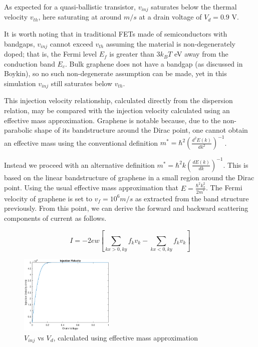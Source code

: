\documentclass[11pt]{article}
\begin{document}
As expected for a quasi-ballistic transistor, $v_{inj}$ saturates below the thermal velocity $v_{th}$, here saturating at around $m/s$ at a drain voltage of $V_d=0.9$ V. 

It is worth noting that in traditional FETs made of semiconductors with bandgaps, $v_{inj}$ cannot exceed $v_{th}$ assuming the material is non-degenerately doped; that is, the Fermi level $E_f$ is greater than $3k_BT$ eV away from the conduction band $E_c$. Bulk graphene does not have a bandgap (as discussed in Boykin), so no such non-degenerate assumption can  be made, yet in this simulation $v_{inj}$ still saturates below $v_{th}$.

This injection velocity relationship, calculated directly from the dispersion relation, may be compared with the injection velocity calculated using an effective mass approximation. Graphene is notable because, due to the non-parabolic shape of its bandstructure around the Dirac point, one cannot obtain an effective mass\cite{ariel2012} using the conventional definition $m^{*} = \hbar^2(\frac{d^2E(k)}{dk^2})^{-1}$. 

Instead we proceed with an alternative definition $m^{*} = \hbar^2k(\frac{dE(k)}{dk})^{-1}$. This is based on the linear bandstructure of graphene in a small region around the Dirac point. Using the usual effective mass approximation that $E=\frac{\hbar^2k_x^2}{2m^{*}}$. The Fermi velocity of graphene is set to $v_f = 10^6 m/s$ as extracted from the band structure previously. From this point, we can derive the forward and backward scattering components of current as follows. 

$$I = -2ew[\sum_{kx>0,ky}{f_kv_k} - \sum_{kx<0,ky}{f_kv_k}]$$
\vspace{1em}

\begin{figure}[h!]
\centering 
\includegraphics[width=0.4\textwidth]{Injection_Velocity.eps}
\caption{$V_{inj}$ vs $V_d$, calculated using effective mass approximation}\label{fig:FET}
\end{figure}
\end{document}
